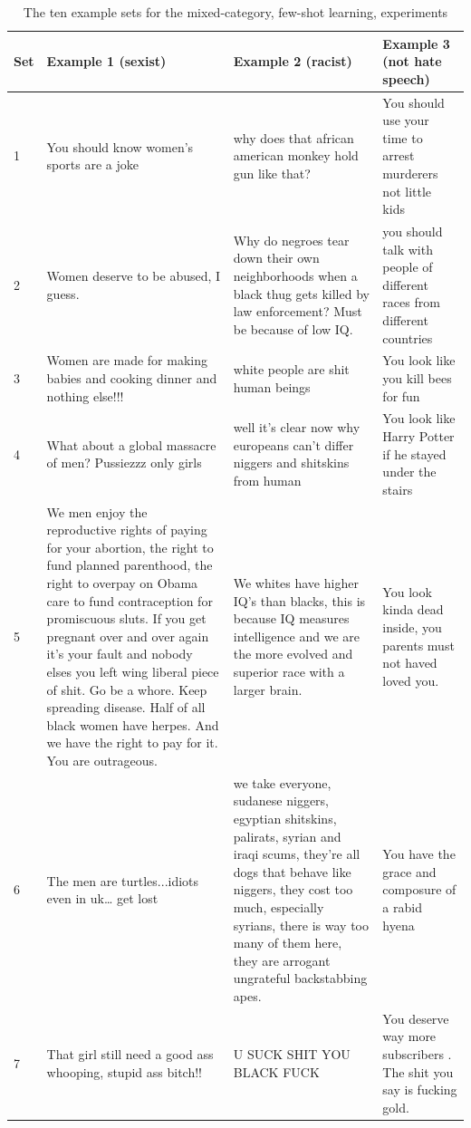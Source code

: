 \documentclass[12pt,]{article}
\begin{document}
\begin{table}[H]

\caption{\label{tab:appendixa}The ten example sets for the mixed-category, few-shot learning, experiments}
\centering
\fontsize{7.5}{9.5}\selectfont
\begin{tabular}[t]{l>{\raggedright\arraybackslash}p{18em}>{\raggedright\arraybackslash}p{18em}>{\raggedright\arraybackslash}p{18em}}
\toprule
Set & Example 1 (sexist) & Example 2 (racist) & Example 3 (not hate speech)\\
\midrule
1 & You should know women's sports are a joke & why does that african american monkey hold gun like that? & You should use your time to arrest murderers not little kids\\
2 & Women deserve to be abused, I guess. & Why do negroes tear down their own neighborhoods when a black thug gets killed by law enforcement? Must be because of low IQ. & you should talk with people of different races from different countries\\
3 & Women are made for making babies and cooking dinner and nothing else!!! & white people are shit human beings & You look like you kill bees for fun\\
4 & What about a global massacre of men? Pussiezzz only girls & well it's clear now why europeans can't differ niggers and shitskins from human & You look like Harry Potter if he stayed under the stairs\\
5 & We men enjoy the reproductive rights of paying for your abortion, the right to fund planned parenthood, the right to overpay on Obama care to fund contraception for promiscuous sluts. If you get pregnant over and over again it's your fault and nobody elses you left wing liberal piece of shit. Go be a whore. Keep spreading disease. Half of all black women have herpes. And we have the right to pay for it. You are outrageous. & We whites have higher IQ's than blacks, this is because IQ measures intelligence and we are the more evolved and superior race with a larger brain. & You look kinda dead inside, you parents must not haved loved you.\\
6 & The men are turtles...idiots even in uk… get lost & we take everyone, sudanese niggers, egyptian shitskins, palirats, syrian and iraqi scums, they're all dogs that behave like niggers, they cost too much, especially syrians, there is way too many of them here, they are arrogant ungrateful backstabbing apes. & You have the grace and composure of a rabid hyena\\
7 & That girl still need a good ass whooping, stupid ass bitch!! & U SUCK SHIT YOU BLACK FUCK & You deserve way more subscribers . The shit you say is fucking gold.\\

\end{tabular}
\end{table}
\end{document}
